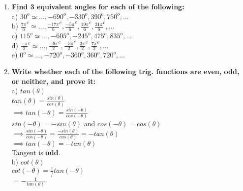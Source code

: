 \begin{enumerate}

\item{{\bf Find 3 equivalent angles for each of the following:}\\

\tab a) $30^o \simeq  ..., -690^o, -330^o, 390^o, 750^o, ...$\\

\tab b) $\frac{7\pi}{6}^c \simeq ..., \frac{-17\pi}{6}^c, \frac{-5\pi}{6}^c, \frac{19\pi}{6}^c, \frac{31\pi}{6}^c, ...$\\

\tab c) $115^o \simeq  ..., -605^o, -245^o, 475^o, 835^o, ...$\\

\tab d) $\frac{-\pi}{2}^c \simeq ..., \frac{-9\pi}{2}^c, \frac{-5\pi}{2}^c, \frac{3\pi}{2}^c, \frac{7\pi}{2}^c, ...$\\

\tab e) $0^o  \simeq  ..., -720^o, -360^o, 360^o, 720^o, ...$\\}

\item{{\bf Write whether each of the following trig. functions are even, odd, or neither, and prove it:}\\

\tab a) $tan(\theta)$\\

\tab\tab $tan(\theta) = \frac{sin(\theta)}{cos(\theta)}$\\

\tab\tab$\implies tan(-\theta) = \frac{sin(-\theta)}{cos(-\theta)}$\\

\tab\tab $sin(-\theta) = - sin(\theta)$ and $cos(-\theta)=cos(\theta)$\\

\tab\tab$\implies \frac{sin(-\theta)}{cos(-\theta)}  = \frac{-sin(\theta)}{cos(\theta)} = -tan(\theta)$\\

\tab\tab $\implies tan(-\theta) = - tan(\theta)$\\

\tab\tab Tangent is {\bf odd}.\\

\tab b) $cot(\theta)$\\

\tab\tab $cot(-\theta) = \frac{1}/{tan(-\theta)}$\\

\tab\tab $= - \frac{1}{tan(\theta)}$\\

}
\end{enumerate}
